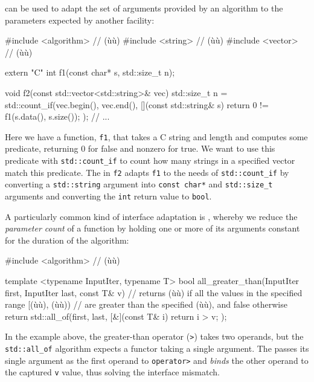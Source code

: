  can be used to adapt the set of arguments
provided by an algorithm to the parameters expected by another facility:

\begin{emcppslisting}
#include <algorithm>  // (ù{}ù)
#include <string>     // (ù{}ù)
#include <vector>     // (ù{}ù)

extern "C" int f1(const char* s, std::size_t n);

void f2(const std::vector<std::string>& vec)
{
    std::size_t n = std::count_if(vec.begin(), vec.end(),
        [](const std::string& s){ return 0 != f1(s.data(), s.size()); });
    // ...
}
\end{emcppslisting}
    

Here we have a function, \lstinline!f1!, that takes a C string and length
and computes some predicate, returning 0 for false and nonzero for true.
We want to use this predicate with \lstinline!std::count_if! to count how
many strings in a specified vector match this predicate. The
 in \lstinline!f2! adapts \lstinline!f1! to the
needs of \lstinline!std::count_if! by converting a \lstinline!std::string!
argument into \lstinline!const!~\lstinline!char*! and \lstinline!std::size_t!
arguments and converting the \lstinline!int! return value to \lstinline!bool!.

A particularly common kind of interface adaptation is , whereby we reduce the \emph{parameter count} of a function
by holding one or more of its arguments constant for the duration of the
algorithm:

\begin{emcppslisting}
#include <algorithm>  // (ù{}ù)

template <typename InputIter, typename T>
bool all_greater_than(InputIter first, InputIter last, const T& v)
    // returns (ù{}ù) if all the values in the specified range [(ù{}ù), (ù{}ù))
    // are greater than the specified (ù{}ù), and false otherwise
{
    return std::all_of(first, last, [&](const T& i) { return i > v; });
}
\end{emcppslisting}
    

In the example above, the greater-than operator (\lstinline!>!) takes two
operands, but the \lstinline!std::all_of! algorithm expects a functor
taking a single argument. The  passes its
single argument as the first operand to \lstinline!operator>! and
\emph{binds} the other operand to the captured \lstinline!v! value, thus
solving the interface mismatch.

